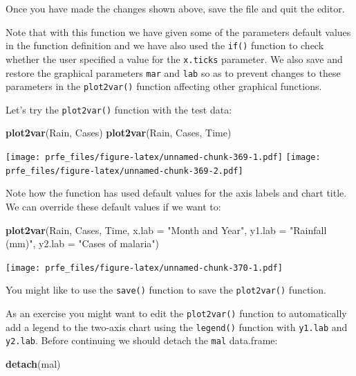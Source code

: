 \documentclass[12pt,a4paper]{book}
\newenvironment{Shaded}{\begin{snugshade}}{\end{snugshade}}
\newcommand{\DataTypeTok}[1]{\textcolor[rgb]{0.13,0.29,0.53}{#1}}
\newcommand{\KeywordTok}[1]{\textcolor[rgb]{0.13,0.29,0.53}{\textbf{#1}}}
\newcommand{\NormalTok}[1]{#1}
\newcommand{\StringTok}[1]{\textcolor[rgb]{0.31,0.60,0.02}{#1}}
\theoremstyle{definition}
\theoremstyle{definition}
\theoremstyle{definition}
\theoremstyle{remark}
\begin{document}
Once you have made the changes shown above, save the file and quit the
editor.

Note that with this function we have given some of the parameters
default values in the function definition and we have also used the
\texttt{if()} function to check whether the user specified a value for
the \texttt{x.ticks} parameter. We also save and restore the graphical
parameters \texttt{mar} and \texttt{lab} so as to prevent changes to
these parameters in the \texttt{plot2var()} function affecting other
graphical functions.

Let's try the \texttt{plot2var()} function with the test data:

\begin{Shaded}
\begin{Highlighting}[]
\KeywordTok{plot2var}\NormalTok{(Rain, Cases)}
\KeywordTok{plot2var}\NormalTok{(Rain, Cases, Time)}
\end{Highlighting}
\end{Shaded}

\texttt{[image: prfe\_files/figure-latex/unnamed-chunk-369-1.pdf]}
\texttt{[image: prfe\_files/figure-latex/unnamed-chunk-369-2.pdf]}

Note how the function has used default values for the axis labels and
chart title. We can override these default values if we want to:

\begin{Shaded}
\begin{Highlighting}[]
\KeywordTok{plot2var}\NormalTok{(Rain, Cases, Time, }\DataTypeTok{x.lab =} \StringTok{"Month and Year"}\NormalTok{,}
         \DataTypeTok{y1.lab =} \StringTok{"Rainfall (mm)"}\NormalTok{, }\DataTypeTok{y2.lab =} \StringTok{"Cases of malaria"}\NormalTok{)}
\end{Highlighting}
\end{Shaded}

\texttt{[image: prfe\_files/figure-latex/unnamed-chunk-370-1.pdf]}

You might like to use the \texttt{save()} function to save the
\texttt{plot2var()} function.

As an exercise you might want to edit the \texttt{plot2var()} function
to automatically add a legend to the two-axis chart using the
\texttt{legend()} function with \texttt{y1.lab} and \texttt{y2.lab}.
Before continuing we should detach the \texttt{mal} data.frame:

\begin{Shaded}
\begin{Highlighting}[]
\KeywordTok{detach}\NormalTok{(mal)}
\end{Highlighting}
\end{Shaded}
\end{document}

